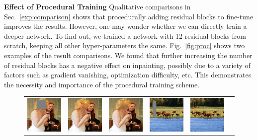 \noindent\textbf{Effect of Procedural Training} Qualitative comparisons in Sec.~\ref{exp:comparison} shows that procedurally adding residual blocks to fine-tune improves the results. However, one may wonder whether we can directly train a deeper network. To find out, we trained a network with 12 residual blocks from scratch, keeping all other hyper-parameters the same. Fig.~\ref{fig:proc} shows two examples of the result comparisons. We found that further increasing the number of residual blocks has a negative effect on inpainting, possibly due to a variety of factors such as gradient vanishing, optimization difficulty, etc. This demonstrates the necessity and importance of the procedural training scheme.

\begin{figure}[h!]
\centering
\small
\begin{tabular}{cccccc}
\includegraphics[width=.16\textwidth]{figures/proc/000000241668_input_image.jpg}&
\includegraphics[width=.16\textwidth]{figures/proc/000000241668_synthesized_image-1.jpg}&
\includegraphics[width=.16\textwidth]{figures/proc/000000241668_synthesized_image.jpg}&
\includegraphics[width=.16\textwidth]{figures/proc/000000314034_input_image.jpg}&
\includegraphics[width=.16\textwidth]{figures/proc/000000314034_synthesized_image-1.jpg}&

\end{tabular}
\end{figure}

